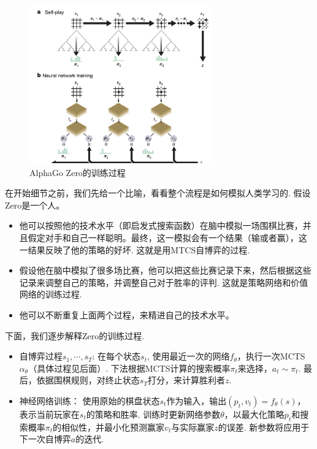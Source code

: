 \begin{figure}[ht]
\centering
\includegraphics[width=0.7\textwidth]{Figures/game/alphazero.png}
    \caption{AlphaGo Zero的训练过程}
    \label{fig:alphago-zero}
\end{figure}

在开始细节之前，我们先给一个比喻，看看整个流程是如何模拟人类学习的. 假设Zero是一个人。
\begin{itemize}
    \item 他可以按照他的技术水平（即启发式搜索函数）在脑中模拟一场围棋比赛，并且假定对手和自己一样聪明。最终，这一模拟会有一个结果（输或者赢），这一结果反映了他的策略的好坏. 这就是用MTCS自博弈的过程.
    \item 假设他在脑中模拟了很多场比赛，他可以把这些比赛记录下来，然后根据这些记录来调整自己的策略，并调整自己对于胜率的评判. 这就是策略网络和价值网络的训练过程.
    \item 他可以不断重复上面两个过程，来精进自己的技术水平。
\end{itemize}

下面，我们逐步解释Zero的训练过程.

\begin{itemize}
    \item 自博弈过程$s_1,\cdots,s_T$: 在每个状态$s_t$, 使用最近一次的网络$f_\theta$，执行一次MCTS $\alpha_\theta$（具体过程见后面）. 下法根据MCTS计算的搜索概率$\pi_t$来选择，$a_t\sim\pi_t$. 最后，依据围棋规则，对终止状态$s_T$打分，来计算胜利者$z$. 
    \item 神经网络训练： 使用原始的棋盘状态$s_t$作为输入，输出$(p_t,v_t)=f_\theta(s)$，表示当前玩家在$s_t$的策略和胜率. 训练时更新网络参数$\theta$，以最大化策略$p_t$和搜索概率$\pi_t$的相似性，并最小化预测赢家$v_t$与实际赢家$z$的误差. 新参数将应用于下一次自博弈$a$的迭代.     
\end{itemize}

